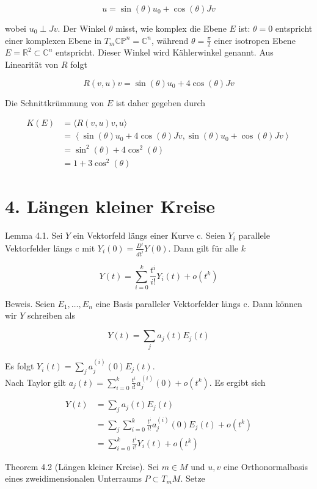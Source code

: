 \documentclass[10pt]{article}
\begin{document}
$$
u=\sin (\theta) u_{0}+\cos (\theta) J v
$$

wobei $u_{0} \perp J v$. Der Winkel $\theta$ misst, wie komplex die Ebene $E$ ist: $\theta=0$ entspricht einer komplexen Ebene in $T_{m} \mathbb{C P}^{n}=\mathbb{C}^{n}$, während $\theta=\frac{\pi}{2}$ einer isotropen Ebene $E=\mathbb{R}^{2} \subset \mathbb{C}^{n}$ entspricht. Dieser Winkel wird Kählerwinkel genannt. Aus Linearität von $R$ folgt

$$
R(v, u) v=\sin (\theta) u_{0}+4 \cos (\theta) J v
$$

Die Schnittkrümmung von $E$ ist daher gegeben durch

$$
\begin{aligned}
K(E) & =\langle R(v, u) v, u\rangle \\
& =\left\langle\sin (\theta) u_{0}+4 \cos (\theta) J v, \sin (\theta) u_{0}+\cos (\theta) J v\right\rangle \\
& =\sin ^{2}(\theta)+4 \cos ^{2}(\theta) \\
& =1+3 \cos ^{2}(\theta)
\end{aligned}
$$

\section*{4. Längen kleiner Kreise}
Lemma 4.1. Sei $Y$ ein Vektorfeld längs einer Kurve c. Seien $Y_{i}$ parallele Vektorfelder längs c mit $Y_{i}(0)=\frac{D^{i}}{d t^{i}} Y(0)$. Dann gilt für alle $k$

$$
Y(t)=\sum_{i=0}^{k} \frac{t^{i}}{i!} Y_{i}(t)+o\left(t^{k}\right)
$$

Beweis. Seien $E_{1}, \ldots, E_{n}$ eine Basis paralleler Vektorfelder längs c. Dann können wir $Y$ schreiben als

$$
Y(t)=\sum_{j} a_{j}(t) E_{j}(t)
$$

Es folgt $Y_{i}(t)=\sum_{j} a_{j}^{(i)}(0) E_{j}(t)$.\\
Nach Taylor gilt $a_{j}(t)=\sum_{i=0}^{k} \frac{t^{i}}{i!} a_{j}^{(i)}(0)+o\left(t^{k}\right)$. Es ergibt sich

$$
\begin{aligned}
Y(t) & =\sum_{j} a_{j}(t) E_{j}(t) \\
& =\sum_{j} \sum_{i=0}^{k} \frac{t^{i}}{i!} a_{j}^{(i)}(0) E_{j}(t)+o\left(t^{k}\right) \\
& =\sum_{i=0}^{k} \frac{t^{i}}{i!} Y_{i}(t)+o\left(t^{k}\right)
\end{aligned}
$$

Theorem 4.2 (Längen kleiner Kreise). Sei $m \in M$ und $u, v$ eine Orthonormalbasis eines zweidimensionalen Unterraums $P \subset T_{m} M$. Setze
\end{document}
